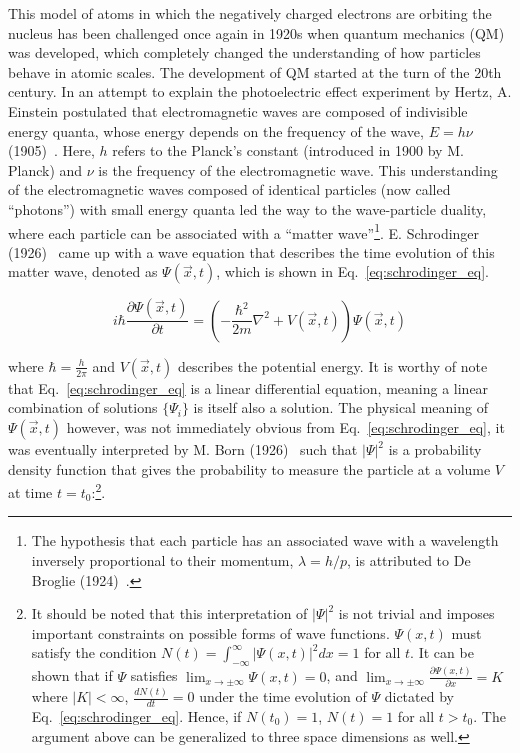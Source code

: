 This model of atoms in which the negatively charged electrons are orbiting the nucleus 
has been challenged once again in 1920s when quantum mechanics (QM) was developed, which completely 
changed the understanding of how particles behave in atomic scales. The development of QM started 
at the turn of the 20th century. In an attempt to explain the photoelectric effect experiment by Hertz,
A. Einstein postulated that electromagnetic waves are composed of indivisible energy quanta, whose energy depends on the
frequency of the wave, $E = h\nu$ (1905)~\cite{Einstein:1905cc}. 
Here, $h$ refers to the Planck's constant (introduced in 1900 by M. Planck) and $\nu$
is the frequency of the electromagnetic wave. This understanding of the electromagnetic waves composed of identical 
particles (now called ``photons'') with small energy quanta led the way to the wave-particle duality, 
where each particle can be associated with a 
``matter wave''\footnote{The hypothesis that each particle has an associated wave with a wavelength inversely
proportional to their momentum, $\lambda = h / p$, is attributed to De Broglie (1924)~\cite{deBroglie:1924ldk}.}. 
E. Schrodinger (1926)~\cite{Schrodinger:1926gei} 
came up with a wave equation that describes the time evolution of this matter wave, denoted as $\Psi(\vec{x}, t)$, 
which is shown in Eq.~\ref{eq:schrodinger_eq}.

\begin{equation}
    i\hbar\frac{\partial \Psi(\vec{x}, t)}{\partial t} = \left(- \frac{\hbar^2}{2m}\nabla^2 + V(\vec{x}, t) \right)\Psi(\vec{x}, t)
    \label{eq:schrodinger_eq}
\end{equation}

where $\hbar = \frac{h}{2\pi}$ and $V(\vec{x}, t)$ describes the potential energy. 
It is worthy of note that Eq.~\ref{eq:schrodinger_eq} is a linear differential equation,
meaning a linear combination of solutions $\{ \Psi_{i} \}$ is itself also a solution.
The physical meaning of $\Psi(\vec{x}, t)$ however,
was not immediately obvious from Eq.~\ref{eq:schrodinger_eq}, it was eventually interpreted by 
M. Born (1926)~\cite{Born:1926uzf}
such that $|\Psi|^2$ is a probability density function that gives the probability to measure the particle
at a volume $V$ at time 
$t=t_{0}$:\footnote{It should be noted that this interpretation of $|\Psi|^2$ is not trivial and imposes important constraints
on possible forms of wave functions. $\Psi(x,t)$ must satisfy the condition 
$N(t) = \int_{-\infty}^{\infty} |\Psi(x,t)|^{2} dx = 1$ for all $t$.
It can be shown that if $\Psi$ satisfies $\lim_{x \rightarrow \pm \infty} \Psi(x,t) = 0$, and
$\lim_{x \rightarrow \pm \infty} \frac{\partial \Psi(x,t)}{\partial x} = K$ where $|K| < \infty$,
$\frac{dN(t)}{dt} = 0$ under the time evolution of $\Psi$ dictated by Eq.~\ref{eq:schrodinger_eq}. 
Hence, if $N(t_0) = 1$, $N(t) = 1$ for all $t > t_0$. The argument above
can be generalized to three space dimensions as well.}.

